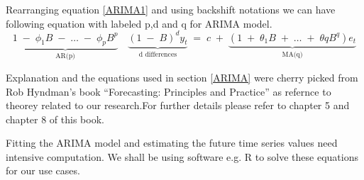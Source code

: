 Rearranging equation \ref{ARIMA1} and using backshift notations we can have following equation with labeled p,d and q for ARIMA model.
$$
\underbrace{1\;-\;\phi_{1}B\;-\;\dotsc\;-\;\phi_{p}B^p}_\text{AR(p)}\quad \underbrace{(1\;-\;B)^d y_{t}}_\text{d differences}\;=\;c\;+\;\underbrace{(1\;+\;\theta_{1}B\;+\;\dotsc\;+\;\theta{q}B^q)e_{t}}_\text{MA(q)}
$$

Explanation and the equations used in section \ref{ARIMA} were cherry picked from Rob Hyndman's book ``Forecasting: Principles and Practice''\cite{hyndman2014forecasting} as refernce to theorey related to our research.For further details please refer to chapter 5 and chapter 8 of this book.

Fitting the ARIMA model and estimating the future time series values need intensive computation. We shall be using software e.g. R to solve these equations for our use cases. 




 
  






 


